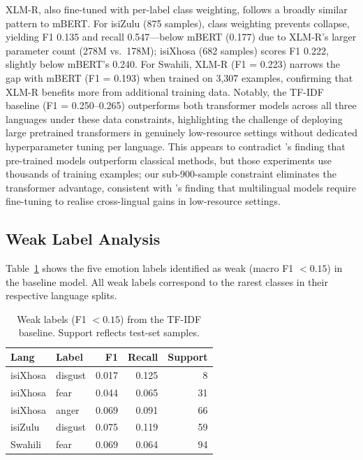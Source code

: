 \documentclass[11pt]{article}
\begin{document}
XLM-R, also fine-tuned with per-label class weighting, follows a broadly
similar pattern to mBERT.
For isiZulu (875 samples), class weighting prevents collapse, yielding
F1 0.135 and recall 0.547---below mBERT (0.177) due to XLM-R's larger
parameter count (278M vs.\ 178M); isiXhosa (682 samples) scores F1 0.222,
slightly below mBERT's 0.240.
For Swahili, XLM-R (F1 = 0.223) narrows the gap with mBERT (F1 = 0.193)
when trained on 3{,}307 examples, confirming that XLM-R benefits more
from additional training data.
Notably, the TF-IDF baseline (F1 = 0.250--0.265) outperforms both
transformer models across all three languages under these data constraints,
highlighting the challenge of deploying large pretrained transformers in
genuinely low-resource settings without dedicated hyperparameter tuning
per language.
This appears to contradict \citet{mabokela2024explainable}'s finding that
pre-trained models outperform classical methods, but those experiments use
thousands of training examples; our sub-900-sample constraint eliminates the
transformer advantage, consistent with \citet{thangaraj2024crosslingual}'s finding that multilingual
models require fine-tuning to realise cross-lingual gains in low-resource settings.

\subsection{Weak Label Analysis}

Table~\ref{tab:weak} shows the five emotion labels identified as weak
(macro F1 $< 0.15$) in the baseline model.
All weak labels correspond to the rarest classes in their respective
language splits.

\begin{table}[h]
\centering
\small
\begin{tabular}{llrrr}
\toprule
\textbf{Lang} & \textbf{Label} & \textbf{F1} & \textbf{Recall} &
  \textbf{Support} \\
\midrule
isiXhosa & disgust & 0.017 & 0.125 & 8 \\
isiXhosa & fear    & 0.044 & 0.065 & 31 \\
isiXhosa & anger   & 0.069 & 0.091 & 66 \\
isiZulu  & disgust & 0.075 & 0.119 & 59 \\
Swahili  & fear    & 0.069 & 0.064 & 94 \\
\bottomrule
\end{tabular}
\caption{Weak labels (F1 $< 0.15$) from the TF-IDF baseline.
Support reflects test-set samples.}
\label{tab:weak}
\end{table}
\end{document}
